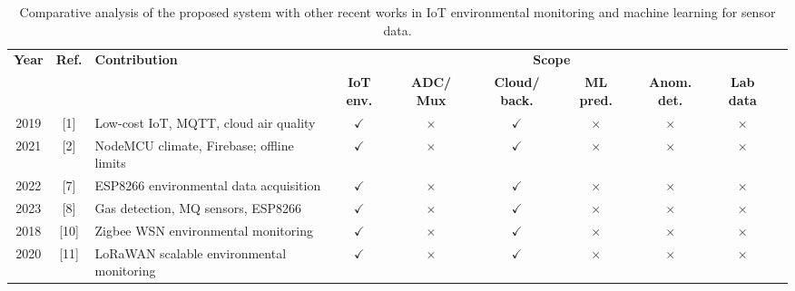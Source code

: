 ﻿\documentclass[journal]{IEEEtran}
\begin{document}
\begin{table}[!h]
    \centering
    \caption{Comparative analysis of the proposed system with other recent
    works in IoT environmental monitoring and machine learning for sensor data.}
    \label{tab:comparative_analysis}

    \scriptsize
    \renewcommand{\arraystretch}{1.15}
    \setlength{\tabcolsep}{3.5pt}

    \begin{tabular}{c c p{4.0cm} c c c c c c c}
        \toprule
        \textbf{Year} &
        \textbf{Ref.} &
        \textbf{Contribution} &
        \multicolumn{6}{c}{\textbf{Scope}} \\

        \cmidrule(lr){4-9}

        & &
        &
        \textbf{IoT env.} &
        \textbf{ADC/ Mux} &
        \textbf{Cloud/ back.} &
        \textbf{ML pred.} &
        \textbf{Anom. det.} &
        \textbf{Lab data} \\

        \midrule

        2019 & [1] &
        Low-cost IoT, MQTT, cloud air quality &
        $\checkmark$ & $\times$ & $\checkmark$ &
        $\times$ & $\times$ & $\times$ \\

        2021 & [2] &
        NodeMCU climate, Firebase; offline limits &
        $\checkmark$ & $\times$ & $\checkmark$ &
        $\times$ & $\times$ & $\times$ \\

        2022 & [7] &
        ESP8266 environmental data acquisition &
        $\checkmark$ & $\times$ & $\checkmark$ &
        $\times$ & $\times$ & $\times$ \\

        2023 & [8] &
        Gas detection, MQ sensors, ESP8266 &
        $\checkmark$ & $\times$ & $\checkmark$ &
        $\times$ & $\times$ & $\times$ \\

        2018 & [10] &
        Zigbee WSN environmental monitoring &
        $\checkmark$ & $\times$ & $\checkmark$ &
        $\times$ & $\times$ & $\times$ \\

        2020 & [11] &
        LoRaWAN scalable environmental monitoring &
        $\checkmark$ & $\times$ & $\checkmark$ &
        $\times$ & $\times$ & $\times$ \\


\end{tabular}
\end{table}
\end{document}

